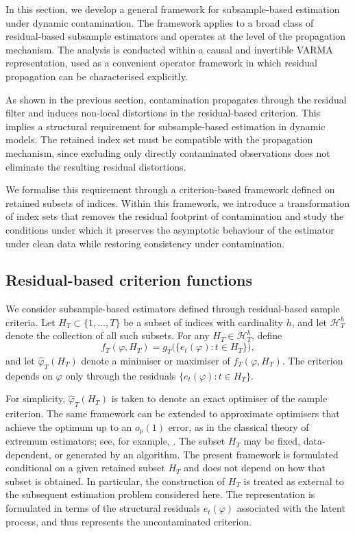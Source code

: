 \documentclass[12pt]{article}
\numberwithin{equation}{section}
\begin{document}
In this section, we develop a general framework for subsample-based estimation under dynamic contamination. 
The framework applies to a broad class of residual-based subsample estimators and operates at the level of the propagation mechanism. 
The analysis is conducted within a causal and invertible VARMA representation, used as a convenient operator framework in which residual propagation can be characterised explicitly.

As shown in the previous section, contamination propagates through the residual filter and induces non-local distortions in the residual-based criterion. 
This implies a structural requirement for subsample-based estimation in dynamic models.
The retained index set must be compatible with the propagation mechanism, since excluding only directly contaminated observations does not eliminate the resulting residual distortions. 

We formalise this requirement through a criterion-based framework defined on retained subsets of indices. 
Within this framework, we introduce a transformation of index sets that removes the residual footprint of contamination and study the conditions under which it preserves the asymptotic behaviour of the estimator under clean data while restoring consistency under contamination.


\subsection{Residual-based criterion functions}

We consider subsample-based estimators defined through residual-based sample criteria. 
Let $H_T \subset \{1,\dots,T\}$ be a subset of indices with cardinality $h$, and let $\mathcal{H}_T^h$ denote the collection of all such subsets. 
For any $H_T \in \mathcal{H}_T^h$, define
\begin{equation}\label{eq:criterion_subsample}
f_T(\varphi,H_T)
=
g_T\bigl(\{e_t(\varphi):t\in H_T\}\bigr),
\end{equation}
and let $\hat{\varphi}_T(H_T)$ denote a minimiser or maximiser of $f_T(\varphi,H_T)$.
The criterion depends on $\varphi$ only through the residuals $\{e_t(\varphi):t\in H_T\}$.

For simplicity, $\hat{\varphi}_T(H_T)$ is taken to denote an exact optimiser of the sample criterion. 
The same framework can be extended to approximate optimisers that achieve the optimum up to an $o_p(1)$ error, as in the classical theory of extremum estimators; see, for example, \citet{vdV1998}.
The subset $H_T$ may be fixed, data-dependent, or generated by an algorithm. 
The present framework is formulated conditional on a given retained subset $H_T$ and does not depend on how that subset is obtained. 
In particular, the construction of $H_T$ is treated as external to the subsequent estimation problem considered here.
The representation is formulated in terms of the structural residuals $e_t(\varphi)$ associated with the latent process, and thus represents the uncontaminated criterion.
\end{document}
